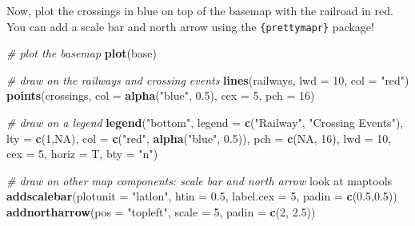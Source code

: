 \documentclass[]{book}
\newenvironment{Shaded}{\begin{snugshade}}{\end{snugshade}}
\newcommand{\CommentTok}[1]{\textcolor[rgb]{0.56,0.35,0.01}{\textit{#1}}}
\newcommand{\DataTypeTok}[1]{\textcolor[rgb]{0.13,0.29,0.53}{#1}}
\newcommand{\DecValTok}[1]{\textcolor[rgb]{0.00,0.00,0.81}{#1}}
\newcommand{\FloatTok}[1]{\textcolor[rgb]{0.00,0.00,0.81}{#1}}
\newcommand{\KeywordTok}[1]{\textcolor[rgb]{0.13,0.29,0.53}{\textbf{#1}}}
\newcommand{\NormalTok}[1]{#1}
\newcommand{\OtherTok}[1]{\textcolor[rgb]{0.56,0.35,0.01}{#1}}
\newcommand{\StringTok}[1]{\textcolor[rgb]{0.31,0.60,0.02}{#1}}
\begin{document}
Now, plot the crossings in blue on top of the basemap with the railroad in red. You can add a scale bar and north arrow using the \texttt{\{prettymapr\}} \citep{R-prettymapr} package!

\begin{Shaded}
\begin{Highlighting}[]
\CommentTok{# plot the basemap}
\KeywordTok{plot}\NormalTok{(base)}

\CommentTok{# draw on the railways and crossing events}
\KeywordTok{lines}\NormalTok{(railways, }\DataTypeTok{lwd =} \DecValTok{10}\NormalTok{, }\DataTypeTok{col =} \StringTok{"red"}\NormalTok{)}
\KeywordTok{points}\NormalTok{(crossings, }\DataTypeTok{col =} \KeywordTok{alpha}\NormalTok{(}\StringTok{"blue"}\NormalTok{, }\FloatTok{0.5}\NormalTok{), }\DataTypeTok{cex =} \DecValTok{5}\NormalTok{, }\DataTypeTok{pch =} \DecValTok{16}\NormalTok{)}

\CommentTok{# draw on a legend}
\KeywordTok{legend}\NormalTok{(}\StringTok{"bottom"}\NormalTok{, }\DataTypeTok{legend =} \KeywordTok{c}\NormalTok{(}\StringTok{"Railway"}\NormalTok{, }\StringTok{"Crossing Events"}\NormalTok{),}
       \DataTypeTok{lty =} \KeywordTok{c}\NormalTok{(}\DecValTok{1}\NormalTok{,}\OtherTok{NA}\NormalTok{), }\DataTypeTok{col =} \KeywordTok{c}\NormalTok{(}\StringTok{"red"}\NormalTok{, }\KeywordTok{alpha}\NormalTok{(}\StringTok{"blue"}\NormalTok{, }\FloatTok{0.5}\NormalTok{)),}
       \DataTypeTok{pch =} \KeywordTok{c}\NormalTok{(}\OtherTok{NA}\NormalTok{, }\DecValTok{16}\NormalTok{), }\DataTypeTok{lwd =} \DecValTok{10}\NormalTok{, }\DataTypeTok{cex =} \DecValTok{5}\NormalTok{, }\DataTypeTok{horiz =}\NormalTok{ T, }\DataTypeTok{bty =} \StringTok{"n"}\NormalTok{)}

\CommentTok{# draw on other map components: scale bar and north arrow}
\NormalTok{look at maptools}
\KeywordTok{addscalebar}\NormalTok{(}\DataTypeTok{plotunit =} \StringTok{"latlon"}\NormalTok{, }\DataTypeTok{htin =} \FloatTok{0.5}\NormalTok{,}
            \DataTypeTok{label.cex =} \DecValTok{5}\NormalTok{, }\DataTypeTok{padin =} \KeywordTok{c}\NormalTok{(}\FloatTok{0.5}\NormalTok{,}\FloatTok{0.5}\NormalTok{))}
\KeywordTok{addnortharrow}\NormalTok{(}\DataTypeTok{pos =} \StringTok{"topleft"}\NormalTok{, }\DataTypeTok{scale =} \DecValTok{5}\NormalTok{, }\DataTypeTok{padin =} \KeywordTok{c}\NormalTok{(}\DecValTok{2}\NormalTok{, }\FloatTok{2.5}\NormalTok{))}
\end{Highlighting}
\end{Shaded}
\end{document}
